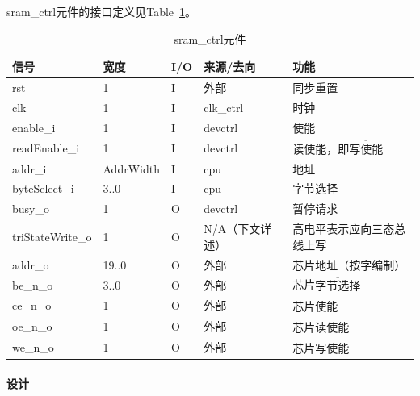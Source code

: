 \documentclass{article}
\begin{document}
\begin{spacing}{1.4}
sram\_ctrl元件的接口定义见Table~\ref{tb:sramctrl-interface}。
\begin{table}[!htb]
\begin{center}
\begin{tabular*}{15cm}{l|l|l|l|p{5cm}}
\hline
\textbf{信号}&\textbf{宽度}&\textbf{I/O}&\textbf{来源/去向}&\textbf{功能} \\
\hline rst                     & 1                      & I     & 外部          & 同步重置 \\
\hline clk                     & 1                      & I     & clk\_ctrl     & 时钟 \\
\hline enable\_i               & 1                      & I     & devctrl       & 使能 \\
\hline readEnable\_i           & 1                      & I     & devctrl       & 读使能，即$\overline{\text{写使能}}$ \\
\hline addr\_i                 & AddrWidth              & I     & cpu           & 地址 \\
\hline byteSelect\_i           & 3..0                   & I     & cpu           & 字节选择 \\
\hline busy\_o                 & 1                      & O     & devctrl       & 暂停请求 \\
\hline triStateWrite\_o        & 1                      & O     & N/A（下文详述）&高电平表示应向三态总线上写 \\
\hline addr\_o                 & 19..0                  & O     & 外部          & 芯片地址（按字编制） \\
\hline be\_n\_o                & 3..0                   & O     & 外部          & 芯片$\overline{\text{字节选择}}$ \\
\hline ce\_n\_o                & 1                      & O     & 外部          & 芯片$\overline{\text{使能}}$ \\
\hline oe\_n\_o                & 1                      & O     & 外部          & 芯片$\overline{\text{读使能}}$ \\
\hline we\_n\_o                & 1                      & O     & 外部          & 芯片$\overline{\text{写使能}}$ \\
\hline
\end{tabular*}
\caption{sram\_ctrl元件}
\label{tb:sramctrl-interface}
\end{center}
\end{table}

\paragraph{设计}\mbox{}


\end{spacing}
\end{document}
